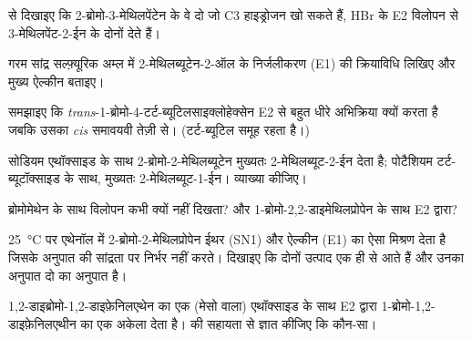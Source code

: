 \begin{exercise}[$\star\star$]\label{exo:b1:elimination:5}
 से दिखाइए कि 2-ब्रोमो-3-मेथिलपेंटेन के वे दो  जो
C3 हाइड्रोजन खो सकते हैं, HBr के E2 विलोपन से
3-मेथिलपेंट-2-ईन के दोनों  देते हैं।
\end{exercise}

\begin{exercise}[$\star\star$]\label{exo:b1:elimination:6}
गरम सांद्र सल्फ़्यूरिक अम्ल में 2-मेथिलब्यूटेन-2-ऑल के निर्जलीकरण (E1) की क्रियाविधि
लिखिए और मुख्य ऐल्कीन बताइए।
\end{exercise}

\begin{exercise}[$\star\star$]\label{exo:b1:elimination:7}
समझाइए कि \textit{trans}-1-ब्रोमो-4-टर्ट-ब्यूटिलसाइक्लोहेक्सेन E2 से बहुत
धीरे अभिक्रिया क्यों करता है जबकि उसका \textit{cis} समावयवी तेज़ी से। (टर्ट-ब्यूटिल
समूह  रहता है।)
\end{exercise}

\begin{exercise}[$\star\star$]\label{exo:b1:elimination:8}
सोडियम एथॉक्साइड के साथ 2-ब्रोमो-2-मेथिलब्यूटेन मुख्यतः
2-मेथिलब्यूट-2-ईन देता है; पोटैशियम टर्ट-ब्यूटॉक्साइड के साथ, मुख्यतः
2-मेथिलब्यूट-1-ईन। व्याख्या कीजिए।
\end{exercise}

\begin{exercise}[$\star\star$]\label{exo:b1:elimination:9}
ब्रोमोमेथेन के साथ विलोपन कभी क्यों नहीं दिखता? और
1-ब्रोमो-2,2-डाइमेथिलप्रोपेन के साथ E2 द्वारा?
\end{exercise}

\begin{exercise}[$\star\star\star$]\label{exo:b1:elimination:10}
\qty{25}{\celsius} पर एथेनॉल में 2-ब्रोमो-2-मेथिलप्रोपेन ईथर (SN1) और
ऐल्कीन (E1) का ऐसा मिश्रण देता है जिसके अनुपात  की
सांद्रता पर निर्भर नहीं करते। दिखाइए कि दोनों उत्पाद
एक ही  से आते हैं और उनका अनुपात दो  का अनुपात है।
\end{exercise}

\begin{exercise}[$\star\star\star$]\label{exo:b1:elimination:11}
1,2-डाइब्रोमो-1,2-डाइफ़ेनिलएथेन का एक  (मेसो वाला) एथॉक्साइड के साथ E2 द्वारा
1-ब्रोमो-1,2-डाइफ़ेनिलएथीन का एक अकेला  देता है।
 की सहायता से ज्ञात कीजिए कि कौन-सा।
\end{exercise}

